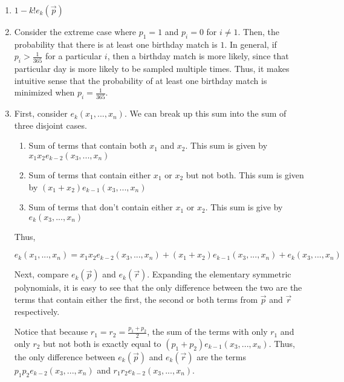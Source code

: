 \begin{enumerate}[label=(\alph*)]
\item $1 - k!e_{k}\left(\overrightarrow{p}\right)$

\item Consider the extreme case where $p_{1} = 1$ and $p_{i} = 0$ for $i \neq 1$. Then, the probability that there is at least one birthday match is $1$. In general, if $p_{i} > \frac{1}{365}$ for a particular $i$, then a birthday match is more likely, since that particular day is more likely to be sampled multiple times. Thus, it makes intuitive sense that the probability of at least one birthday match is minimized when $p_{i} = \frac{1}{365}$.

\item First, consider $e_{k}\left(x_{1},...,x_{n}\right)$. We can break up this sum into the sum of three disjoint cases.
  \begin{enumerate}
    \item Sum of terms that contain both $x_{1}$ and $x_{2}$. This sum is given by $x_{1}x_{2}e_{k-2}\left(x_{3},...,x_{n}\right)$

    \item Sum of terms that contain either $x_{1}$ or $x_{2}$ but not both. This sum is given by $\left(x_{1} + x_{2}\right)e_{k-1}\left(x_{3},...,x_{n}\right)$

    \item Sum of terms that don't contain either $x_{1}$ or $x_{2}$. This sum is give by $e_{k}\left(x_{3},...,x_{n}\right)$
  \end{enumerate}

  Thus, 

  $$e_{k}(x_{1},...,x_{n}) = x_{1}x_{2}e_{k-2}(x_{3},...,x_{n}) + (x_{1} + x_{2})e_{k-1}(x_{3},...,x_{n}) + e_{k}(x_{3},...,x_{n})$$

  Next, compare $e_{k}\left(\overrightarrow{p}\right)$ and $e_{k}\left(\overrightarrow{r}\right)$. Expanding the elementary symmetric polynomials, it is easy to see that the only difference between the two are the terms that contain either the first, the second or both terms from $\overrightarrow{p}$ and $\overrightarrow{r}$ respectively. 

  Notice that because $r_{1} = r_{2} = \frac{p_{1} + p_{2}}{2}$, the sum of the terms with only $r_{1}$ and only $r_{2}$ but not both is exactly equal to $(p_{1} + p_{2})e_{k-1}(x_{3},...,x_{n})$. Thus, the only difference between $e_{k}\left(\overrightarrow{p}\right)$ and $e_{k}\left(\overrightarrow{r}\right)$ are the terms $p_{1}p_{2}e_{k-2}(x_{3},...,x_{n})$ and $r_{1}r_{2}e_{k-2}(x_{3},...,x_{n})$.


\end{enumerate}
